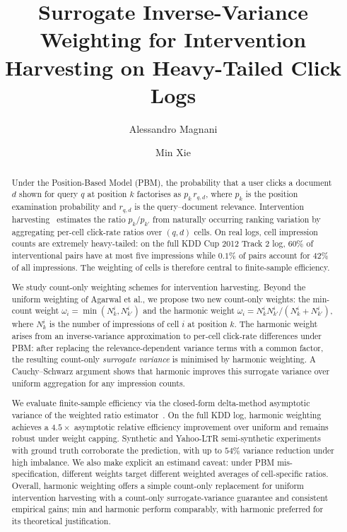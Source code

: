 \documentclass[sigconf]{acmart}
\title{Surrogate Inverse-Variance Weighting for Intervention Harvesting on Heavy-Tailed Click Logs}
\author{Alessandro Magnani}
\affiliation{%
  \institution{Coupang}
  \city{Mountain View}
  \state{CA}
  \country{USA}
}
\author{Min Xie}
\affiliation{%
  \institution{Coupang}
  \city{Mountain View}
  \state{CA}
  \country{USA}
}
\begin{document}
\begin{abstract}
Under the Position-Based Model (PBM), the probability that a user
clicks a document $d$ shown for query $q$ at position $k$ factorises
as $p_k\,r_{q,d}$, where $p_k$ is the position examination probability
and $r_{q,d}$ is the query--document relevance. Intervention
harvesting~\cite{agarwal2019estimating} estimates the ratio
$p_k/p_{k'}$ from naturally occurring ranking variation by aggregating
per-cell click-rate ratios over $(q,d)$ cells. On real logs, cell
impression counts are extremely heavy-tailed: on the full KDD Cup 2012
Track 2 log, $60\%$ of interventional pairs have at most five
impressions while $0.1\%$ of pairs account for $42\%$ of all
impressions. The weighting of cells is therefore central to
finite-sample efficiency.

We study count-only weighting schemes for intervention harvesting.
Beyond the uniform weighting of Agarwal et al., we propose two new
count-only weights: the min-count weight
$\omega_i=\min(N_k^i,N_{k'}^i)$ and the harmonic weight
$\omega_i=N_k^iN_{k'}^i/(N_k^i+N_{k'}^i)$, where $N_k^i$ is the number
of impressions of cell $i$ at position $k$. The harmonic weight arises
from an inverse-variance approximation to per-cell click-rate
differences under PBM: after replacing the relevance-dependent
variance terms with a common factor, the resulting count-only
\emph{surrogate variance} is minimised by harmonic weighting. A
Cauchy--Schwarz argument shows that harmonic improves this surrogate
variance over uniform aggregation for any impression counts.

We evaluate finite-sample efficiency via the closed-form delta-method
asymptotic variance of the weighted ratio
estimator~\cite{owen2013mc,vdv1998asymptotic}. On the full KDD log,
harmonic weighting achieves a $4.5{\times}$ asymptotic relative
efficiency improvement over uniform and remains robust under weight
capping. Synthetic and Yahoo-LTR semi-synthetic experiments with
ground truth corroborate the prediction, with up to $54\%$ variance
reduction under high imbalance. We also make explicit an estimand
caveat: under PBM mis-specification, different weights target
different weighted averages of cell-specific ratios. Overall,
harmonic weighting offers a simple count-only replacement for uniform
intervention harvesting with a count-only surrogate-variance guarantee
and consistent empirical gains; min and harmonic perform comparably,
with harmonic preferred for its theoretical justification.
\end{abstract}
\end{document}

